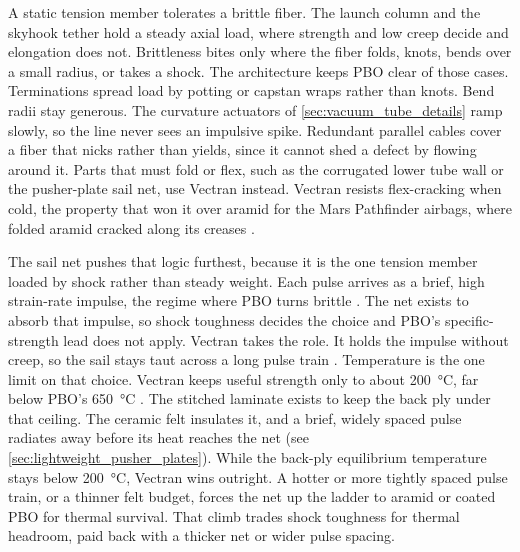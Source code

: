 \documentclass{article}
\begin{document}
A static tension member tolerates a brittle fiber. The launch column and the skyhook tether hold a steady axial load, where strength and low creep decide and elongation does not. Brittleness bites only where the fiber folds, knots, bends over a small radius, or takes a shock. The architecture keeps PBO clear of those cases. Terminations spread load by potting or capstan wraps rather than knots. Bend radii stay generous. The curvature actuators of \autoref{sec:vacuum_tube_details} ramp slowly, so the line never sees an impulsive spike. Redundant parallel cables cover a fiber that nicks rather than yields, since it cannot shed a defect by flowing around it. Parts that must fold or flex, such as the corrugated lower tube wall or the pusher-plate sail net, use Vectran instead. Vectran resists flex-cracking when cold, the property that won it over aramid for the Mars Pathfinder airbags, where folded aramid cracked along its creases \cite{pathfinder_airbag}.

The sail net pushes that logic furthest, because it is the one tension member loaded by shock rather than steady weight. Each pulse arrives as a brief, high strain-rate impulse, the regime where PBO turns brittle \cite{pbo_strain_rate_dbt}. The net exists to absorb that impulse, so shock toughness decides the choice and PBO's specific-strength lead does not apply. Vectran takes the role. It holds the impulse without creep, so the sail stays taut across a long pulse train \cite{vectran_brochure}. Temperature is the one limit on that choice. Vectran keeps useful strength only to about \SI{200}{\celsius}, far below PBO's \SI{650}{\celsius} \cite{vectran_brochure, zylon_technical_info}. The stitched laminate exists to keep the back ply under that ceiling. The ceramic felt insulates it, and a brief, widely spaced pulse radiates away before its heat reaches the net (see \autoref{sec:lightweight_pusher_plates}). While the back-ply equilibrium temperature stays below \SI{200}{\celsius}, Vectran wins outright. A hotter or more tightly spaced pulse train, or a thinner felt budget, forces the net up the ladder to aramid or coated PBO for thermal survival. That climb trades shock toughness for thermal headroom, paid back with a thicker net or wider pulse spacing.
\end{document}
